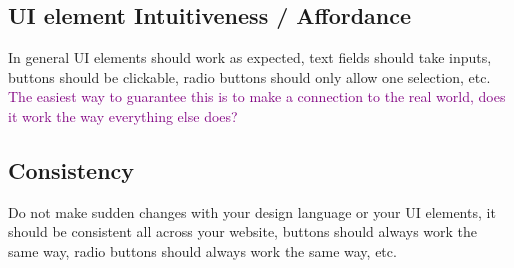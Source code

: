 \documentclass[main.tex,fontsize=6pt,paper=a4,paper=landscape,DIV=calc,]{scrartcl}
\begin{document}
\begin{multicols*}{4}
\subsection{UI element Intuitiveness / Affordance}  
In general UI elements should work as expected, text fields should take inputs, buttons should be clickable, radio buttons should only allow one selection, etc.\newline
\textcolor{purple}{The easiest way to guarantee this is to make a connection to the real world, does it work the way everything else does?}

\subsection{Consistency}  
Do not make sudden changes with your design language or your UI elements, it should be consistent all across your website, buttons should always work the same way, radio buttons should always work the same way, etc.


\end{multicols*}
\end{document}
